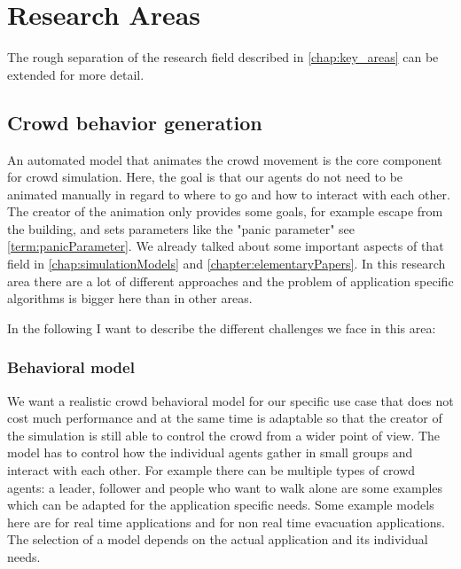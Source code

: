\documentclass{acmsiggraph}               %
\begin{document}
\section{Research Areas}

The rough separation of the research field described in \ref{chap:key_areas} can be extended for more detail. \cite{thalmann_crowd_2013}

\subsection{Crowd behavior generation}

An automated model that animates the crowd movement is the core component for crowd simulation. Here, the goal is that our agents do not need to be animated manually in regard to where to go and how to interact with each other. The creator of the animation only provides some goals, for example escape from the building, and sets parameters like the "panic parameter" see \ref{term:panicParameter}. We already talked about some important aspects of that field in \ref{chap:simulationModels} and \ref{chapter:elementaryPapers}.  In this research area there are a lot of different approaches and the problem of application specific algorithms is bigger here than in other areas.

In the following I want to describe the different challenges we face in this area:

\subsubsection{Behavioral model}
We want a realistic crowd behavioral model for our specific use case that does not cost much performance and at the same time is adaptable so that the creator of the simulation is still able to control the crowd from a wider point of view. The model has to control how the individual agents gather in small groups and interact with each other. For example there can be multiple types of crowd agents: a leader, follower and people who want to walk alone are some examples which can be adapted for the application specific needs. Some example models here are \cite{musse_hierarchical_2001} for real time applications and \cite{braun_simulating_2005} for non real time evacuation applications. The selection of a model depends on the actual application and its individual needs.
\end{document}
